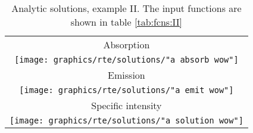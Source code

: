 \begin{table}[htdp]
\caption[Analytic solutions, example II]{Analytic solutions, example II. The input functions are shown in table \eqref{tab:fcns:II}}
\begin{center}
\begin{tabular}{c}
%
Absorption \\
\texttt{[image: graphics/rte/solutions/"a absorb wow"]} \\[10pt]
%
Emission \\
\texttt{[image: graphics/rte/solutions/"a emit wow"]} \\[10pt]
%
Specific intensity \\
\texttt{[image: graphics/rte/solutions/"a solution wow"]} \\
%
%
\end{tabular}
\end{center}
\label{rte:solutions II}
\end{table}%


\endinput %